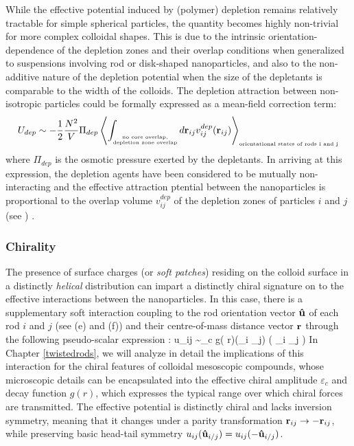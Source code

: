 While the effective potential induced by (polymer) depletion  remains relatively tractable for simple spherical particles, the quantity becomes highly non-trivial for more complex colloidal shapes. This is due to the intrinsic orientation-dependence of the depletion zones and their overlap conditions when generalized to suspensions involving rod or disk-shaped nanoparticles, and also to the non-additive nature of the depletion potential when the size of the depletants is comparable to the width of the colloids. The depletion attraction between non-isotropic particles could be formally expressed as a mean-field correction term:
 \begin{equation}
U_{dep} \sim  -\frac{1}{2} \frac{N^{2}}{V} \Pi_{dep} \left \langle \int_{
\substack{
\mbox{\tiny no core overlap,} \\
\mbox{\tiny depletion zone overlap}
}
} d {\bf r}_{ij}   v^{dep}_{ij}({\bf r}_{ij})  \right \rangle_{\mbox{\tiny orientational states of rods i and j}}
\label{degen}
\end{equation}
where $\Pi_{dep}$ is the osmotic pressure exerted by the depletants. In arriving at this expression, the depletion agents have been considered to be mutually non-interacting and the effective attraction ptential between the nanoparticles is proportional to the overlap volume $v^{dep}_{ij}$ of the depletion zones of particles $i$ and $j$ (see ) \cite{LekkerkerkerTuinier2011}.

\subsubsection{Chirality}

The presence of surface charges (or {\em soft patches}) residing on the colloid surface in a distinctly {\em helical} distribution can impart a distinctly chiral signature on to the effective interactions between the nanoparticles. In this case, there is a supplementary soft interaction coupling to the rod orientation vector ${\bf \hat{u}}$ of each rod $i$ and $j$ (see  (e) and (f)) and their centre-of-mass distance vector $\bf r$ through the following pseudo-scalar expression \cite{goossens71}:
\beq
u_{ij} \sim  \varepsilon_{c} g( r)({\bf {}}_{i} _{j}) ( {\bf {}}_{i} _{j}  )
\label{chirality}
\eeq
In Chapter \ref{twistedrods}, we will analyze in detail the implications of this interaction for the chiral features of colloidal mesoscopic compounds, whose microscopic details can be encapsulated into the effective chiral amplitude $\varepsilon_c$ and decay function $g(r)$, which expresses the typical range over which chiral forces are transmitted. The effective potential is distinctly chiral and lacks inversion symmetry, meaning that it changes under a parity transformation ${\bf r}_{ij} \rightarrow -{\bf r}_{ij} $, while preserving basic head-tail symmetry $u_{ij}({\bf \hat{u}}_{i/j}) = u_{ij}(-{\bf \hat{u}}_{i/j}) $.

